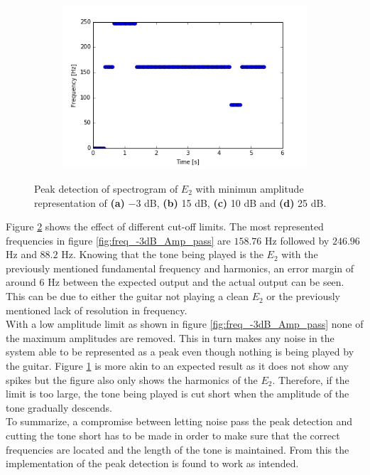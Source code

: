 \begin{figure}[H]
\begin{subfigure}{0.49\textwidth}
\includegraphics[width=\textwidth]{figures/peak_detection/peak_lim4.png}
\caption{}
\label{fig:freq_25dB_Amp_pass}

\end{subfigure}
\caption{Peak detection of spectrogram of $E_2$ with minimun amplitude representation of \textbf{(a)} $-3$ dB, \textbf{(b)} 15 dB, \textbf{(c)} 10 dB and \textbf{(d)} 25 dB.}
\label{fig:valdation_peak_detection}
\end{figure}
Figure \ref{fig:valdation_peak_detection} shows the effect of different cut-off limits. The most represented frequencies in figure \ref{fig:freq_-3dB_Amp_pass} are $158.76$ Hz followed by $246.96$ Hz and $88.2$ Hz. 
Knowing that the tone being played is the $E_2$ with the previously mentioned fundamental frequency and harmonics, an error margin of around $6$ Hz between the expected output and the actual output can be seen. This can be due to either the guitar not playing a clean $E_2$ or the previously mentioned lack of resolution in frequency.
\\
With a low amplitude limit as shown in figure \ref{fig:freq_-3dB_Amp_pass} none of the maximum amplitudes are removed. This in turn makes any noise in the system able to be represented as a peak even though nothing is being played by the guitar.
Figure \ref{fig:freq_25dB_Amp_pass} is more akin to an expected result as it does not show any spikes but the figure also only shows the harmonics of the $E_2$. Therefore, if the limit is too large, the tone being played is cut short when the amplitude of the tone gradually descends.
\\
To summarize, a compromise between letting noise pass the peak detection and cutting the tone short has to be made in order to make sure that the correct frequencies are located and the length of the tone is maintained. From this the implementation of the peak detection is found to work as intended.